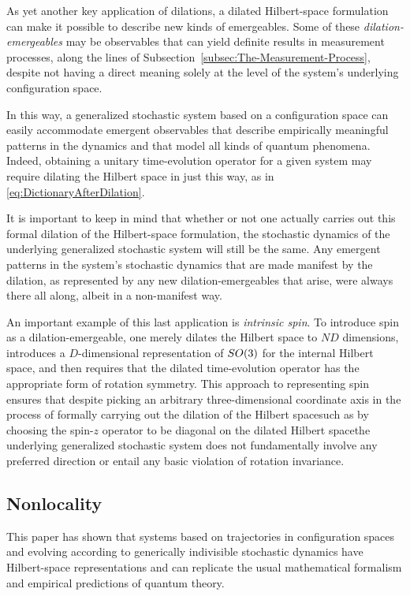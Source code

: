 \documentclass[12pt,english,prl,superscriptaddress,nobibnotes,nofootinbib]{revtex4-2}
\let\originalleft\left
\let\originalright\right
\renewcommand{\left}{\mathopen{}\mathclose\bgroup\originalleft}
\renewcommand{\right}{\aftergroup\egroup\originalright}
\begin{document}
As yet another key application of dilations, a dilated Hilbert-space
formulation can make it possible to describe new kinds of emergeables.
Some of these \emph{dilation-emergeables} may be observables that
can yield definite results in measurement processes, along the lines
of Subsection~\ref{subsec:The-Measurement-Process}, despite not
having a direct meaning solely at the level of the system's underlying
configuration space.

In this way, a generalized stochastic system based on a configuration
space can easily accommodate emergent observables that describe empirically
meaningful patterns in the dynamics and that model all kinds of quantum
phenomena. Indeed, obtaining a unitary time-evolution operator for
a given system may require dilating the Hilbert space in just this
way, as in \eqref{eq:DictionaryAfterDilation}.

It is important to keep in mind that whether or not one actually carries
out this formal dilation of the Hilbert-space formulation, the stochastic
dynamics of the underlying generalized stochastic system will still
be the same. Any emergent patterns in the system's stochastic dynamics
that are made manifest by the dilation, as represented by any new
dilation-emergeables that arise, were always there all along, albeit
in a non-manifest way.

An important example of this last application is \emph{intrinsic spin}.
To introduce spin as a dilation-emergeable, one merely dilates the
Hilbert space to $ND$ dimensions, introduces a $D$-dimensional representation
of $SO\left(3\right)$ for the internal Hilbert space, and then requires
that the dilated time-evolution operator has the appropriate form
of rotation symmetry. This approach to representing spin ensures that
despite picking an arbitrary three-dimensional coordinate axis in
the process of formally carrying out the dilation of the Hilbert space\textemdash such
as by choosing the spin-$z$ operator to be diagonal on the dilated
Hilbert space\textemdash the underlying generalized stochastic system
does not fundamentally involve any preferred direction or entail any
basic violation of rotation invariance.

\subsection{Nonlocality\label{subsec:Nonlocality}}

This paper has shown that systems based on trajectories in configuration
spaces and evolving according to generically indivisible stochastic
dynamics have Hilbert-space representations and can replicate the
usual mathematical formalism and empirical predictions of quantum
theory.
\end{document}
